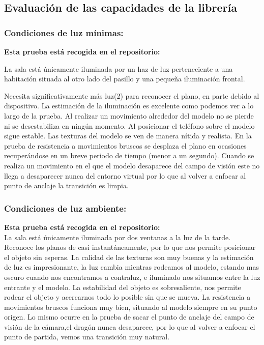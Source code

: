 \subsection{Evaluación de las capacidades de la librería}

\subsubsection{Condiciones de luz mínimas:}

\textbf{Esta prueba está recogida en el repositorio:}

La sala está únicamente iluminada por un haz de luz perteneciente a una habitación situada al otro lado del pasillo y una pequeña iluminación frontal.

Necesita significativamente más luz(2) para reconocer el plano, en parte debido al dispositivo. La estimación de la iluminación es excelente como podemos ver a lo largo de la prueba. Al realizar un movimiento alrededor del modelo no se pierde ni se desestabiliza en ningún momento. Al posicionar el teléfono sobre el modelo sigue estable. Las texturas del modelo se ven de manera nítida y realista. En la prueba de resistencia a movimientos bruscos se desplaza el plano en ocasiones recuperándose en un breve periodo de tiempo (menor a un segundo). Cuando se realiza un movimiento en el que el modelo desaparece del campo de visión este no llega a desaparecer nunca del entorno virtual por lo que al volver a enfocar al punto de anclaje la transición es limpia.

\subsubsection{Condiciones de luz ambiente:\\}

\textbf{Esta prueba está recogida en el repositorio:}\\
La sala está únicamente iluminada por dos ventanas a la luz de la tarde.\\
Reconoce los planos de casi instantáneamente, por lo que nos permite posicionar el objeto sin esperas. La calidad de las texturas son muy buenas y la estimación de luz es impresionante, la luz cambia mientras rodeamos al modelo, estando mas oscuro cuando nos encontramos a contraluz, e iluminado nos situamos entre la luz entrante y el modelo. La estabilidad del objeto es sobresaliente, nos permite rodear el objeto y acercarnos todo lo posible sin que se mueva. La resistencia a movimientos bruscos funciona muy bien, situando al modelo siempre en su punto origen. Lo mismo ocurre en la prueba de sacar el punto de anclaje del campo de visión de la cámara,el dragón nunca desaparece, por lo que al volver a enfocar el punto de partida, vemos una transición muy natural.


